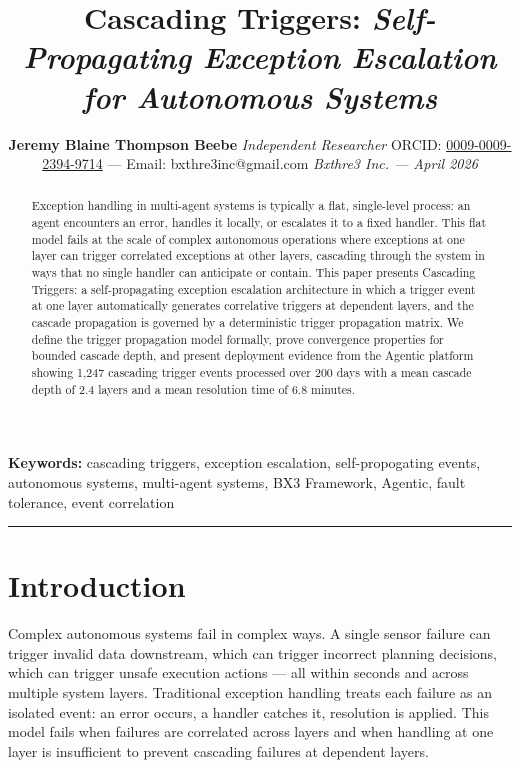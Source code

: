 \documentclass[12pt]{article}
\title{
    \vspace{1.2cm}
    {\LARGE \textbf{Cascading Triggers:}} \break
    {\large \textit{Self-Propagating Exception Escalation for Autonomous Systems}}
}
\author{
    \textbf{Jeremy Blaine Thompson Beebe} \break
    \textit{Independent Researcher} \break
    ORCID: \href{https://orcid.org/0009-0009-2394-9714}{0009-0009-2394-9714} --- Email: bxthre3inc@gmail.com \break
    \textit{Bxthre3 Inc. --- April 2026}
}
\begin{document}
\maketitle
\thispagestyle{fancy}

\begin{abstract}\noindent
Exception handling in multi-agent systems is typically a flat, single-level process: an agent encounters an error, handles it locally, or escalates it to a fixed handler. This flat model fails at the scale of complex autonomous operations where exceptions at one layer can trigger correlated exceptions at other layers, cascading through the system in ways that no single handler can anticipate or contain. This paper presents Cascading Triggers: a self-propagating exception escalation architecture in which a trigger event at one layer automatically generates correlative triggers at dependent layers, and the cascade propagation is governed by a deterministic trigger propagation matrix. We define the trigger propagation model formally, prove convergence properties for bounded cascade depth, and present deployment evidence from the Agentic platform showing 1,247 cascading trigger events processed over 200 days with a mean cascade depth of 2.4 layers and a mean resolution time of 6.8 minutes.
\end{abstract}

\vspace{0.5em}
\noindent\textbf{Keywords:} cascading triggers, exception escalation, self-propogating events, autonomous systems, multi-agent systems, BX3 Framework, Agentic, fault tolerance, event correlation

\vspace{1em}
\hrule
\vspace{1em}

\onehalfspacing

\section{Introduction}
\label{sec:intro}

Complex autonomous systems fail in complex ways. A single sensor failure can trigger invalid data downstream, which can trigger incorrect planning decisions, which can trigger unsafe execution actions --- all within seconds and across multiple system layers. Traditional exception handling treats each failure as an isolated event: an error occurs, a handler catches it, resolution is applied. This model fails when failures are correlated across layers and when handling at one layer is insufficient to prevent cascading failures at dependent layers.
\end{document}
